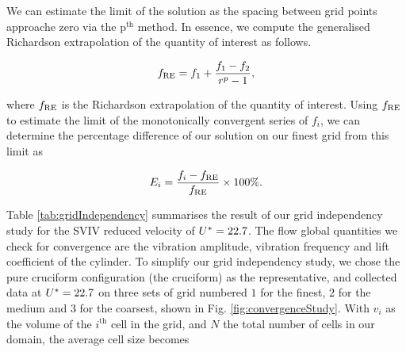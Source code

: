 \documentclass[oneside]{utmthesis}
\begin{document}
We can estimate the limit of the solution as the spacing between grid points approache zero via the $\text{p}^{\text{th}}$ method. In essence, we compute the generalised Richardson extrapolation of the quantity of interest as follows.

\begin{equation}
  f_{\text{RE}} = f_{1} + \frac{f_{1} - f_{2}}{r^{p} - 1},
  \label{eq:richardsonExtrapolation}
\end{equation}

\noindent where $f_{\text{RE}}$ is the Richardson extrapolation of the quantity of interest. Using $f_{\text{RE}}$ to estimate the limit of the monotonically convergent series of $f_{i}$, we can determine the percentage difference of our solution on our finest grid from this limit as

\begin{equation}
  E_{i} = \frac{f_{i} - f_{\text{RE}}}{f_{\text{RE}}} \times 100\%.
  \label{eq:percentageDifference}
\end{equation}

Table \ref{tab:gridIndependency} summarises the result of our grid independency study for the SVIV reduced velocity of $U^{*} = 22.7$. The flow global quantities we check for convergence are the vibration amplitude, vibration frequency and lift coefficient of the cylinder. To simplify our grid independency study, we chose the pure cruciform configuration (the \angfi{} cruciform) as the representative, and collected data at $U^{*} = 22.7$ on three sets of grid numbered $1$ for the finest, $2$ for the medium and $3$ for the coarsest, shown in Fig. \ref{fig:convergenceStudy}. With $v_{i}$ as the volume of the $i^{\text{th}}$ cell in the grid, and $N$ the total number of cells in our domain, the average cell size becomes
\end{document}
